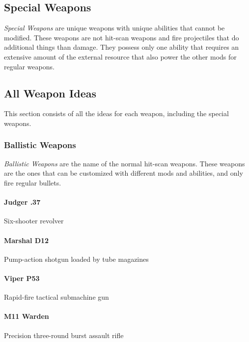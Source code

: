 \documentclass[../Main.tex]{subfiles}
\begin{document}
\subsection{Special Weapons}

\emph{Special Weapons} are unique weapons with unique abilities that cannot be modified. These weapons are not hit-scan weapons and fire projectiles that do additional things than damage. They possess only one ability that requires an extensive amount of the external resource that also power the other mods for regular weapons. 

\subsection{All Weapon Ideas}

This section consists of all the ideas for each weapon, including the special weapons.

\subsubsection{Ballistic Weapons}

\emph{Ballistic Weapons} are the name of the normal hit-scan weapons. These weapons are the ones that can be customized with different mods and abilities, and only fire regular bullets.

\paragraph{Judger .37}

Six-shooter revolver

\paragraph{Marshal D12}

Pump-action shotgun loaded by tube magazines

\paragraph{Viper P53}

Rapid-fire tactical submachine gun

\paragraph{M11 Warden}

Precision three-round burst assault rifle
\end{document}
